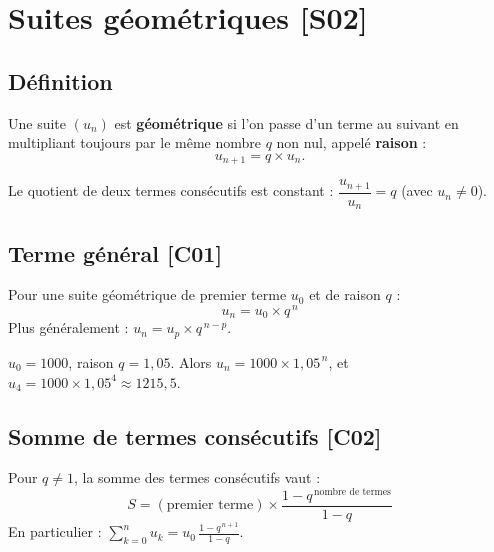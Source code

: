 \documentclass[a4paper,11pt]{article}
\begin{document}
\newpage
\section{Suites géométriques \hfill {\normalsize\color{uimmred}[S02]}}

\subsection{Définition}

\begin{definition}
Une suite $(u_n)$ est \textbf{géométrique} si l'on passe d'un terme au suivant en multipliant toujours par le même nombre $q$ non nul, appelé \textbf{raison} :
\[
u_{n+1} = q \times u_n.
\]
\end{definition}

\begin{methode}
Le quotient de deux termes consécutifs est constant : $\dfrac{u_{n+1}}{u_n} = q$ (avec $u_n \neq 0$).
\end{methode}

\subsection{Terme général \hfill {\normalsize\color{uimmred}[C01]}}

\begin{theoreme}
Pour une suite géométrique de premier terme $u_0$ et de raison $q$ :
\[
\boxed{u_n = u_0 \times q^{\,n}}
\]
Plus généralement : $u_n = u_p \times q^{\,n-p}$.
\end{theoreme}

\begin{exemple}
$u_0 = 1000$, raison $q = 1{,}05$. Alors $u_n = 1000 \times 1{,}05^{\,n}$, et $u_4 = 1000 \times 1{,}05^4 \approx 1215{,}5$.
\end{exemple}

\subsection{Somme de termes consécutifs \hfill {\normalsize\color{uimmred}[C02]}}

\begin{theoreme}
Pour $q \neq 1$, la somme des termes consécutifs vaut :
\[
\boxed{S = (\text{premier terme}) \times \frac{1 - q^{\,\text{nombre de termes}}}{1 - q}}
\]
En particulier : $\displaystyle \sum_{k=0}^{n} u_k = u_0 \,\frac{1 - q^{\,n+1}}{1 - q}$.
\end{theoreme}
\end{document}
